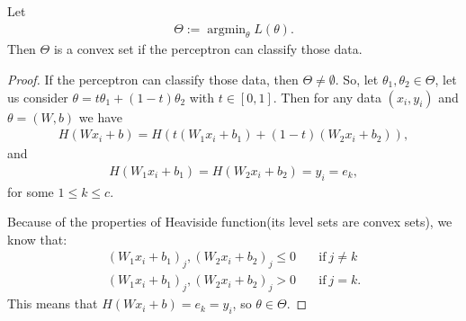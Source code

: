\begin{theorem}\label{theo:linearconvex}
Let
\begin{align}
\Theta := \mathop{\arg\min}_{\theta}L(\theta).
\end{align}
Then $\Theta$ is a convex set if the perceptron can classify those data.
\end{theorem}

\begin{proof}
If the perceptron can classify those data, then $\Theta \neq \emptyset$. So, let $\theta_1, \theta_2 \in \Theta$, let us consider $\theta = t\theta_1 + (1-t)\theta_2$ with $t \in [0,1]$.
Then for any data $(x_i, y_i)$ and $\theta = (W, b)$ we have
\begin{align}
H(Wx_i + b) = H(t(W_1x_i + b_1) + (1-t)(W_2x_i + b_2)),
\end{align}
and 
\begin{align}
H(W_1x_i + b_1) = H(W_2x_i + b_2) = y_i = e_k,
\end{align}
for some $1 \le k \le c$.

Because of the properties of Heaviside function(its level sets are convex sets), we know that:
\begin{align}
(W_1 x_i + b_1)_j, (W_2 x_i + b_2)_j  \le 0 \quad &\text{if}~ j \neq k \\
(W_1 x_i + b_1)_j, (W_2 x_i + b_2)_j    > 0 \quad &\text{if}~ j = k.
\end{align}
This means that $H(Wx_i + b) = e_k = y_i$, so $\theta \in \Theta$.
\end{proof}



